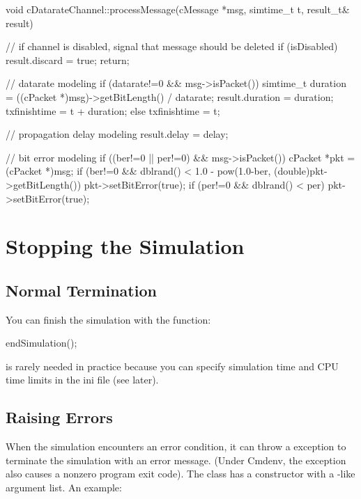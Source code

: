 \begin{cpp}
void cDatarateChannel::processMessage(cMessage *msg, simtime_t t, result_t& result)
{
    // if channel is disabled, signal that message should be deleted
    if (isDisabled) {
        result.discard = true;
        return;
    }

    // datarate modeling
    if (datarate!=0 && msg->isPacket()) {
        simtime_t duration = ((cPacket *)msg)->getBitLength() / datarate;
        result.duration = duration;
        txfinishtime = t + duration;
    }
    else {
        txfinishtime = t;
    }

    // propagation delay modeling
    result.delay = delay;

    // bit error modeling
    if ((ber!=0 || per!=0) && msg->isPacket()) {
        cPacket *pkt = (cPacket *)msg;
        if (ber!=0 && dblrand() < 1.0 - pow(1.0-ber, (double)pkt->getBitLength())
            pkt->setBitError(true);
        if (per!=0 && dblrand() < per)
            pkt->setBitError(true);
    }
}
\end{cpp}



\section{Stopping the Simulation}
\label{sec:simple-modules:stopping}

\subsection{Normal Termination}
\label{sec:simple-modules:endsimulation}

You can finish the simulation with the  function:

\begin{cpp}
endSimulation();
\end{cpp}

 is rarely needed in practice because you
can specify simulation time and CPU time limits
in the ini file (see later).

\subsection{Raising Errors}
\label{sec:simple-modules:raising-errors}

When the simulation encounters an error condition, it can throw a
 exception to terminate the simulation with an error
message. (Under Cmdenv, the exception also causes a nonzero program exit
code). The  class has a constructor with a
-like argument list. An example:

